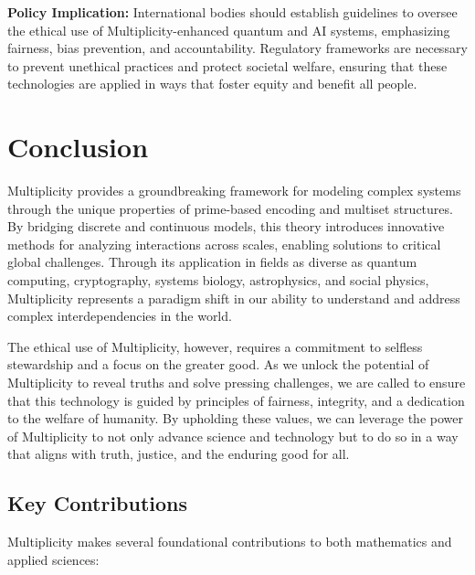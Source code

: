 \documentclass{article}
\begin{document}
\textbf{Policy Implication:} International bodies should establish guidelines to oversee the ethical use of Multiplicity-enhanced quantum and AI systems, emphasizing fairness, bias prevention, and accountability. Regulatory frameworks are necessary to prevent unethical practices and protect societal welfare, ensuring that these technologies are applied in ways that foster equity and benefit all people.

\section{Conclusion}

Multiplicity provides a groundbreaking framework for modeling complex systems through the unique properties of prime-based encoding and multiset structures. By bridging discrete and continuous models, this theory introduces innovative methods for analyzing interactions across scales, enabling solutions to critical global challenges. Through its application in fields as diverse as quantum computing, cryptography, systems biology, astrophysics, and social physics, Multiplicity represents a paradigm shift in our ability to understand and address complex interdependencies in the world.

The ethical use of Multiplicity, however, requires a commitment to selfless stewardship and a focus on the greater good. As we unlock the potential of Multiplicity to reveal truths and solve pressing challenges, we are called to ensure that this technology is guided by principles of fairness, integrity, and a dedication to the welfare of humanity. By upholding these values, we can leverage the power of Multiplicity to not only advance science and technology but to do so in a way that aligns with truth, justice, and the enduring good for all.


\subsection{Key Contributions}

Multiplicity makes several foundational contributions to both mathematics and applied sciences:
\end{document}

